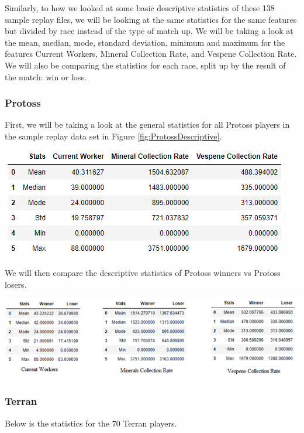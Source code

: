 \documentclass[a4paper,12pt]{report}
\begin{document}
Similarly, to how we looked at some basic descriptive statistics of these 138 sample replay files, we will be looking at the same statistics for the same features but divided by race instead of the type of match up. We will be taking a look at the mean, median, mode, standard deviation, minimum and maximum for the features Current Workers, Mineral Collection Rate, and Vespene Collection Rate. We will also be comparing the statistics for each race, split up by the result of the match: win or loss. 

\subsubsection{Protoss}
First, we will be taking a look at the general statistics for all Protoss players in the sample replay data set in Figure \ref{fig:ProtossDescriptive}. 

\begin{center}
    \captionsetup{type=figure}
    \includegraphics[width=.9\linewidth]{media/ProtossDescriptive.png}
    \label{fig:ProtossDescriptive}
\end{center}

We will then compare the descriptive statistics of Protoss winners vs Protoss losers. 

\begin{center}
    \captionsetup{type=figure}
    \includegraphics[width=.9\linewidth]{media/ProtossWinnervsLoser.png}
\end{center}

\subsubsection{Terran}
Below is the statistics for the 70 Terran players.
\end{document}
